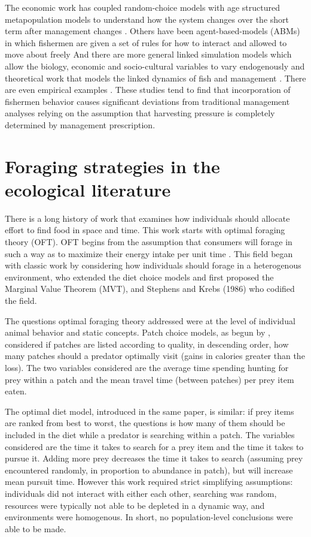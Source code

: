\documentclass[12pt,a4paper]{report}
\begin{document}
The economic work has coupled random-choice models with age structured metapopulation models to understand how the system changes over the short term after management changes \citep{Smithetal:2008, Wilenetal:2002}. Others have been agent-based-models (ABMs) in which fishermen are given a set of rules for how to interact and allowed to move about freely \citep{HilbornWalters:1987, AllenMcGlade:1986, McGarvey:1994, Littleetal:2004, Wilsonetal:2007} And there are more general linked simulation models which allow the biology, economic and socio-cultural variables to vary endogenously \citep{Plaganyietal:2013} and theoretical work that models the linked dynamics of fish and management \citep{CarpenterBrock:2004, Crepin:2007, Kramer:2008}. There are even empirical examples \citep{BasurtoL2005, Basurto:2008, Stenecketal:2011}. These studies tend to find that incorporation of fishermen behavior causes significant deviations from traditional management analyses relying on the assumption that harvesting pressure is completely determined by management prescription. 

\section{Foraging strategies in the ecological literature}
There is a long history of work that examines how individuals should allocate effort to find food in space and time. This work starts with optimal foraging theory (OFT). OFT begins from the assumption that consumers will forage in such a way as to maximize their energy intake per unit time \citep{Krivan:2010}. This field began with classic work by \cite{MacArthurPianka:1966} considering how individuals should forage in a heterogenous environment, \cite{Charnov:1976} who extended the diet choice models and first proposed the Marginal Value Theorem (MVT), and Stephens and Krebs (1986) who codified the field. 

The questions optimal foraging theory addressed were at the level of individual animal behavior and static concepts. Patch choice models, as begun by \cite{MacArthurPianka:1966}, considered if patches are listed according to quality, in descending order, how many patches should a predator optimally visit (gains in calories greater than the loss). The two variables considered are the average time spending hunting for prey within a patch and the mean travel time (between patches) per prey item eaten.

The optimal diet model, introduced in the same paper, is similar: if prey items are ranked from best to worst, the questions is how many of them should be included in the diet while a predator is searching within a patch. The variables considered are the time it takes to search for a prey item and the time it takes to pursue it. Adding more prey decreases the time it takes to search (assuming prey encountered randomly, in proportion to abundance in patch), but will increase mean pursuit time. However this work required strict simplifying assumptions: individuals did not interact with either each other, searching was random, resources were typically not able to be depleted in a dynamic way, and environments were homogenous. In short, no population-level conclusions were able to be made. 
\end{document}
